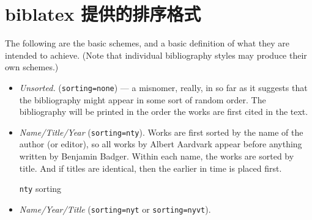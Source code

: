 \section{biblatex 提供的排序格式}

The following are the basic schemes, and a
basic definition of what they are intended to achieve. (Note that
individual bibliography styles may produce their own schemes.)

\begin{itemize}
\item
  \emph{Unsorted.} (\texttt{sorting=none}) --- a misnomer, really, in so far as
  it suggests that the bibliography might appear in some sort of random
  order. The bibliography will be printed in the order the works are
  first cited in the text.
\item
  \emph{Name/Title/Year} (\texttt{sorting=nty}). Works are first sorted by the
  name of the author (or editor), so all works by Albert Aardvark appear
  before anything written by Benjamin Badger. Within each name, the
  works are sorted by title. And if titles are identical, then the
  earlier in time is placed first.
  \begin{marginfigure}[-20ex]
  \vspace{3pt}
  \caption{\texttt{nty} sorting}
  \end{marginfigure}
\item \emph{Name/Year/Title} (\texttt{sorting=nyt} or \texttt{sorting=nyvt}).

\end{itemize}
